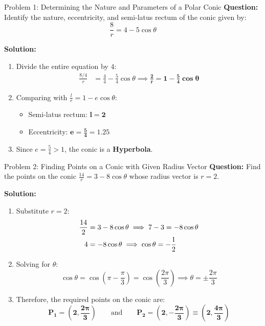 \documentclass[11pt,a4paper]{article}
\begin{document}
\begin{exbox}{Problem 1: Determining the Nature and Parameters of a Polar Conic}
\textbf{Question:} Identify the nature, eccentricity, and semi-latus rectum of the conic given by:
\begin{equation}
    \frac{8}{r} = 4 - 5\cos\theta
\end{equation}

\textbf{Solution:}
\begin{enumerate}
    \item Divide the entire equation by $4$:
    \begin{align}
        \frac{8/4}{r} &= \frac{4}{4} - \frac{5}{4}\cos\theta \implies \mathbf{\frac{2}{r} = 1 - \frac{5}{4}\cos\theta}
    \end{align}
    \item Comparing with $\frac{l}{r} = 1 - e\cos\theta$:
    \begin{itemize}
        \item Semi-latus rectum: $\mathbf{l = 2}$
        \item Eccentricity: $\mathbf{e = \frac{5}{4} = 1.25}$
    \end{itemize}
    \item Since $e = \frac{5}{4} > 1$, the conic is a \textbf{Hyperbola}.
\end{enumerate}
\end{exbox}

\begin{exbox}{Problem 2: Finding Points on a Conic with Given Radius Vector}
\textbf{Question:} Find the points on the conic $\frac{14}{r} = 3 - 8\cos\theta$ whose radius vector is $r = 2$.

\textbf{Solution:}
\begin{enumerate}
    \item Substitute $r = 2$:
    \begin{align}
        \frac{14}{2} &= 3 - 8\cos\theta \implies 7 - 3 = -8\cos\theta \notag \\
        4 &= -8\cos\theta \implies \cos\theta = -\frac{1}{2}
    \end{align}
    \item Solving for $\theta$:
    \begin{equation}
        \cos\theta = \cos\left(\pi - \frac{\pi}{3}\right) = \cos\left(\frac{2\pi}{3}\right) \implies \theta = \pm \frac{2\pi}{3}
    \end{equation}
    \item Therefore, the required points on the conic are:
    \begin{equation}
        \mathbf{P_1 = \left(2, \frac{2\pi}{3}\right)} \qquad \text{and} \qquad \mathbf{P_2 = \left(2, -\frac{2\pi}{3}\right) \equiv \left(2, \frac{4\pi}{3}\right)}
    \end{equation}
\end{enumerate}
\end{exbox}
\end{document}
